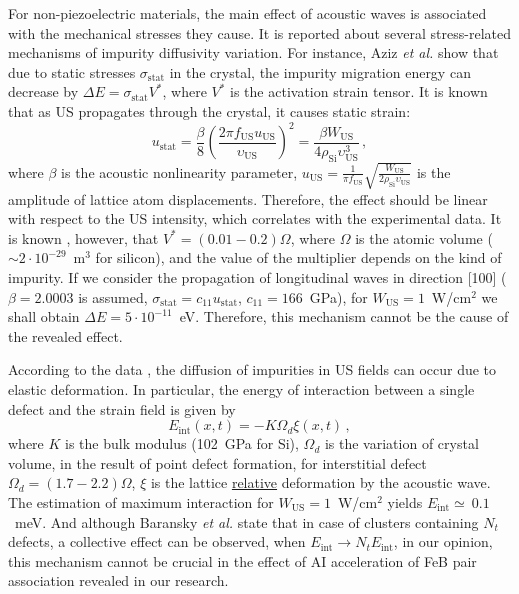 \documentclass[%
 aip,jap,
 amsmath,amssymb,
 reprint,%
]{revtex4-1}
\begin{document}
For non-piezoelectric materials,
the main effect of acoustic waves is associated with the mechanical stresses they cause.
It is reported \cite{AZIZ2001,AzizPhysRev,FeStrain,MirzadeJAP2011,MirzadeJAP2008,PeleshchakUJF2016,Pavlovich,Krevchik} about several stress-related mechanisms of impurity diffusivity variation.
For instance, Aziz \emph{et al.} \cite{AZIZ2001,AzizPhysRev} show that due to static stresses
$\sigma_\mathrm{stat}$ in the crystal,
the impurity migration energy can decrease by
$\Delta E=\sigma_\mathrm{stat}V^\ast$,
where $V^\ast$ is the activation strain tensor.
It is known\cite{Yost} that as US propagates through the crystal,
it causes static strain:
\begin{equation}
\label{eqUstat}
u_\mathrm{stat}=\frac{\beta}{8}\left(\frac{2\pi f_\mathrm{US}u_\mathrm{US}}{\upsilon_\mathrm{US}}\right)^2
=\frac{\beta W_\mathrm{US}}{4\rho_\mathrm{Si}\upsilon_\mathrm{US}^3}\,,
\end{equation}
where
$\beta$ is the acoustic nonlinearity parameter,
$u_\mathrm{US}=\frac{1}{\pi f_\mathrm{US}}\sqrt{\frac{W_\mathrm{US}}{2\rho_\mathrm{Si}\upsilon_\mathrm{US}}}$
is the amplitude of lattice atom displacements.
Therefore, the effect should be linear with respect to the US intensity, which correlates with the experimental data.
It is known \cite{AzizPhysRev,Chen2006}, however, that $V^\ast=(0.01-0.2)\Omega$,
where
$\Omega$ is the atomic volume ($\sim2\cdot10^{-29}$~m$^3$ for silicon),
and the value of the multiplier depends on the kind of impurity.
If we consider the propagation of longitudinal waves in direction [100]
($\beta=2.0003$ is assumed\cite{NelinSi}, $\sigma_\mathrm{stat}=c_{11} u_\mathrm{stat}$,
$c_{11}=166$~GPa),
for $W_\mathrm{US}=1$~W/cm$^2$  we shall obtain $\Delta E=5\cdot10^{-11}$~eV.
Therefore, this mechanism cannot be the cause of the revealed effect.

According to the data \cite{MirzadeJAP2011,MirzadeJAP2008,PeleshchakUJF2016}, the diffusion of impurities in US fields can occur due to elastic deformation.
In particular, the energy of interaction between a single defect and the strain field is given by
\begin{equation}
\label{eqEint}
E_\mathrm{int}(x,t)=-K\Omega_d\xi(x,t)\,,
\end{equation}
where $K$ is the bulk modulus (102~GPa for Si),
$\Omega_d$ is the variation of crystal volume, in the result of point defect formation,
for interstitial defect \cite{MirzadeJAP2008} $\Omega_d=(1.7-2.2)\Omega$,
$\xi$ is the lattice \textcolor[rgb]{0.00,0.07,1.00}{\uline{relative}} deformation by the acoustic wave.
The estimation of maximum interaction for
$W_\mathrm{US}=1$~W/cm$^2$ yields $E_\mathrm{int}\simeq~0.1$~meV.
And although Baransky \emph{et al.} \cite{BaranskyPSS} state that in case of clusters containing $N_t$ defects, a collective effect can be observed, when $E_\mathrm{int}\rightarrow N_t E_\mathrm{int}$,
in our opinion, this mechanism cannot be crucial in the effect of AI acceleration of  FeB pair association revealed in our research.
\end{document}
